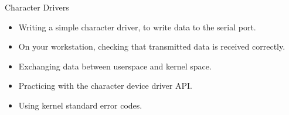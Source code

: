 \setuplabframe
{Character Drivers}
{
  \begin{itemize}
  \item Writing a simple character driver, to write data to the serial
    port.
  \item On your workstation, checking that transmitted data is
    received correctly.
  \item Exchanging data between userspace and kernel space.
  \item Practicing with the character device driver API.
  \item Using kernel standard error codes.
  \end{itemize}
}
